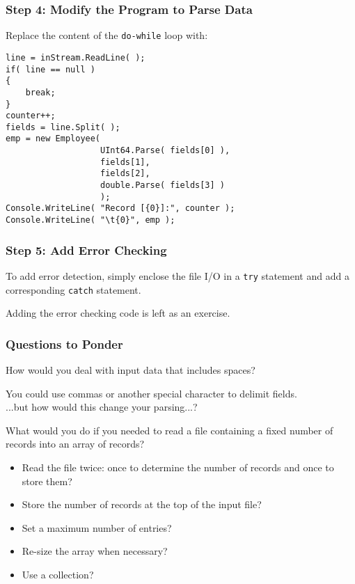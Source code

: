 \begin{frame}[fragile]
\frametitle{Step 4: Modify the Program to Parse Data}
Replace the content of the \texttt{do-while} loop with:
{\scriptsize
\begin{verbatim}
line = inStream.ReadLine( );
if( line == null )
{
    break;
}
counter++;
fields = line.Split( );
emp = new Employee(
                   UInt64.Parse( fields[0] ),
                   fields[1],
                   fields[2],
                   double.Parse( fields[3] ) 
                   );
Console.WriteLine( "Record [{0}]:", counter );
Console.WriteLine( "\t{0}", emp );
\end{verbatim}
}

\end{frame}

\begin{frame}
\frametitle{Step 5: Add Error Checking}

To add error detection, simply enclose the file I/O in a \texttt{try} statement and add a corresponding \texttt{catch} statement.

Adding the error checking code is left as an exercise.

\end{frame}

\begin{frame}
\frametitle{Questions to Ponder}
How would you deal with input data that includes spaces?

You could use commas or another special character to delimit fields.\\
\quad ...but how would this change your parsing...?

What would you do if you needed to read a file containing a fixed number of records into an array of records?
\begin{itemize}
    \item Read the file twice: once to determine the number of records and once to store them?
    \item Store the number of records at the top of the input file?
    \item Set a maximum number of entries?
    \item Re-size the array when necessary?
    \item Use a collection?
\end{itemize}

\end{frame}

